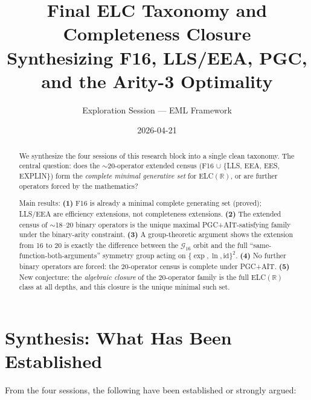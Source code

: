 \documentclass[11pt]{article}
\title{Final ELC Taxonomy and Completeness Closure\\
{\large Synthesizing F16, LLS/EEA, PGC, and the Arity-3 Optimality}}
\author{Exploration Session --- EML Framework}
\date{2026-04-21}
\begin{document}
\maketitle

\begin{abstract}
We synthesize the four sessions of this research block into a single clean taxonomy.
The central question: does the $\sim$20-operator extended census
(F16 $\cup$ \{LLS, EEA, EES, EXPLIN\})
form the \emph{complete minimal generative set} for ELC$(\mathbb{R})$,
or are further operators forced by the mathematics?

Main results:
\textbf{(1)} F16 is already a minimal complete generating set (proved);
LLS/EEA are efficiency extensions, not completeness extensions.
\textbf{(2)} The extended census of $\sim$18--20 binary operators is the unique
maximal PGC+AIT-satisfying family under the binary-arity constraint.
\textbf{(3)} A group-theoretic argument shows the extension from 16 to 20 is
exactly the difference between the $\mathcal{G}_{16}$ orbit and the full
``same-function-both-arguments'' symmetry group acting on $\{\exp, \ln, \mathrm{id}\}^2$.
\textbf{(4)} No further binary operators are forced: the 20-operator census is
complete under PGC+AIT.
\textbf{(5)} New conjecture: the \emph{algebraic closure} of the 20-operator family
is the full ELC$(\mathbb{R})$ class at all depths, and this closure is the
unique minimal such set.
\end{abstract}

\tableofcontents
\bigskip

\section{Synthesis: What Has Been Established}
\label{sec:synthesis}

From the four sessions, the following have been established or strongly argued:
\end{document}
